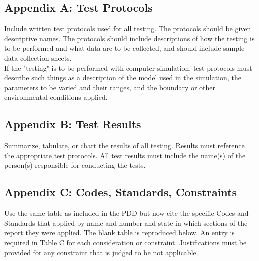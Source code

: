 \documentclass[12pt,a4paper]{report}
\begin{document}
\subsection{Appendix A: Test Protocols}
Include written test protocols used for all testing.  The protocols should be given descriptive names. The protocols should include descriptions of how the testing is to be performed and what data are to be collected, and should include sample data collection sheets.\\
If the "testing" is to be performed with computer simulation, test protocols must describe such things as a description of the model used in the simulation, the parameters to be varied and their ranges, and the boundary or other environmental conditions applied.\\
%
%
\subsection{Appendix B: Test Results}
Summarize, tabulate, or chart the results of all testing. Results must reference the appropriate test protocols.  All test results must include the name(s) of the person(s) responsible for conducting the tests.\\
%
\subsection{Appendix C: Codes, Standards, Constraints}
Use the same table as included in the PDD but now cite the specific Codes and Standards that applied by name and number and state in which sections of the report they were applied.  The blank table is reproduced below.  An entry is required in Table C for each consideration or constraint.  Justifications must be provided for any constraint that is judged to be not applicable.\\
%
\end{document}
